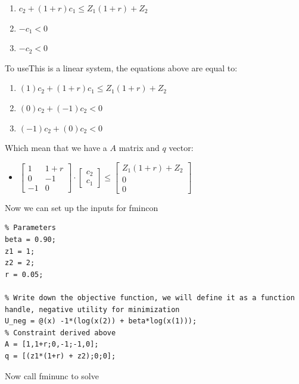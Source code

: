 \documentclass[
]{book}
\providecommand{\tightlist}{%
  \setlength{\itemsep}{0pt}\setlength{\parskip}{0pt}}
\begin{document}
\begin{enumerate}
\def\labelenumi{\arabic{enumi}.}
\item
  \(\displaystyle c_2 +(1+r)c_1 \le Z_1 (1+r)+Z_2\)
\item
  \(\displaystyle -c_1 <0\)
\item
  \(\displaystyle -c_2 <0\)
\end{enumerate}

To useThis is a linear system, the equations above are equal to:

\begin{enumerate}
\def\labelenumi{\arabic{enumi}.}
\item
  \(\displaystyle (1)c_2 +(1+r)c_1 \le Z_1 (1+r)+Z_2\)
\item
  \(\displaystyle (0)c_2 +(-1)c_2 <0\)
\item
  \(\displaystyle (-1)c_2 +(0)c_2 <0\)
\end{enumerate}

Which mean that we have a \(A\) matrix and \(q\) vector:

\begin{itemize}
\tightlist
\item
  \(\displaystyle \left\lbrack \begin{array}{cc} 1 & 1+r\\ 0 & -1\\ -1 & 0 \end{array}\right\rbrack \cdot \left\lbrack \begin{array}{c} c_2 \\ c_1 \end{array}\right\rbrack \le \left\lbrack \begin{array}{c} Z_1 (1+r)+Z_2 \\ 0\\ 0 \end{array}\right\rbrack\)
\end{itemize}

Now we can set up the inputs for fmincon

\begin{verbatim}
% Parameters
beta = 0.90;
z1 = 1;
z2 = 2;
r = 0.05;

% Write down the objective function, we will define it as a function handle, negative utility for minimization
U_neg = @(x) -1*(log(x(2)) + beta*log(x(1)));
% Constraint derived above
A = [1,1+r;0,-1;-1,0];
q = [(z1*(1+r) + z2);0;0];
\end{verbatim}

Now call fminunc to solve
\end{document}

